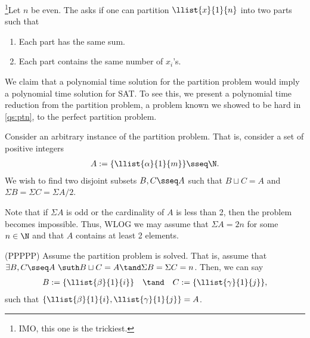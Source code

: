 \documentclass{article}
\begin{document}

\begin{subexercise}
  \footnote[3]{IMO, this one is the trickiest.}Let $n$ be even.
  The  asks if one can partition $ \llist{x}{1}{n} $ into two parts such that
  \begin{enumerate}[label=(\alph*)]
    \item Each part has the same sum.
    \item Each part contains the same number of $ x_i $'s.
  \end{enumerate}
\end{subexercise}
\begin{solution}
  We claim that a polynomial time solution for the partition problem would imply a polynomial time solution for SAT.
  To see this, we present a polynomial time reduction from the partition problem, a problem known we showed to be hard in \ref{qs:ptn}, to the perfect partition problem.

  Consider an arbitrary instance of the partition problem.
  That is, consider a set of positive integers \begin{align*}
    A := \{\llist{\alpha}{1}{m}\} \sseq \N.
  \end{align*}
  We wish to find two disjoint subsets $ B,C\sseq A $ such that $ B\sqcup C = A $ and $ \Sigma B = \Sigma C = \Sigma A / 2$.

  Note that if $ \Sigma A $ is odd or the cardinality of $ A $ is less than 2, then the problem becomes impossible.
  Thus, WLOG we may assume that $ \Sigma A = 2n $ for some $ n\in \N $ and that $ A $ contains at least 2 elements.

  \begin{subproof}[Correctness.]
    (PP\imp PPP)
    Assume the partition problem is solved.
    That is, assume that $ \exists B,C\sseq A\ \suth B\sqcup C = A \tand \Sigma B = \Sigma C = n $.
    Then, we can say
    \begin{align*}
      B := \{\llist{\beta}{1}{i}\} \quad \tand \quad C := \{\llist{\gamma}{1}{j}\},
    \end{align*}
    such that $ \{\llist{\beta}{1}{i},\llist{\gamma}{1}{j}\} = A $.


\end{subproof}
\end{solution}
\end{document}
